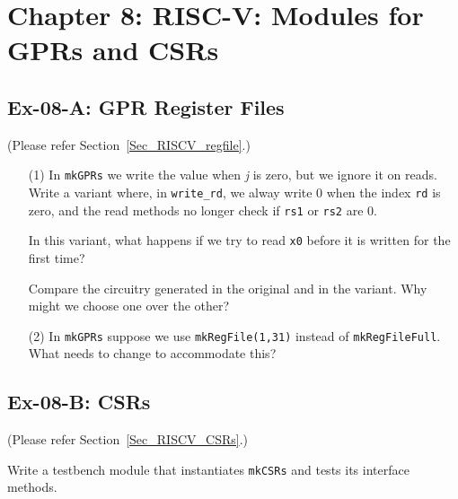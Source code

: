 
\hdivider

\section*{Chapter 8: RISC-V: Modules for GPRs and CSRs}


\subsection*{Ex-08-A: GPR Register Files}
\label{Ex-08-A-GPR-Register-Files}

(Please refer Section~\ref{Sec_RISCV_regfile}.)

\begin{itemize}

\item[(1)] In {\tt mkGPRs} we write the value when \emph{j} is zero, but we
      ignore it on reads.  Write a variant where, in {\tt write\_rd},
      we alway write 0 when the index {\tt rd} is zero, and the read
      methods no longer check if {\tt rs1} or {\tt rs2} are 0.

      In this variant, what happens if we try to read {\tt x0} before
      it is written for the first time?

      Compare the circuitry generated in the original and in the
      variant.  Why might we choose one over the other?

\item[(2)] In {\tt mkGPRs} suppose we use {\tt mkRegFile(1,31)} instead of
      {\tt mkRegFileFull}.  What needs to change to accommodate this?

\end{itemize}


\subsection*{Ex-08-B: CSRs}
\label{Ex-08-B-CSRs}

(Please refer Section~\ref{Sec_RISCV_CSRs}.)

Write a testbench module that instantiates {\tt mkCSRs} and tests its
interface methods.

